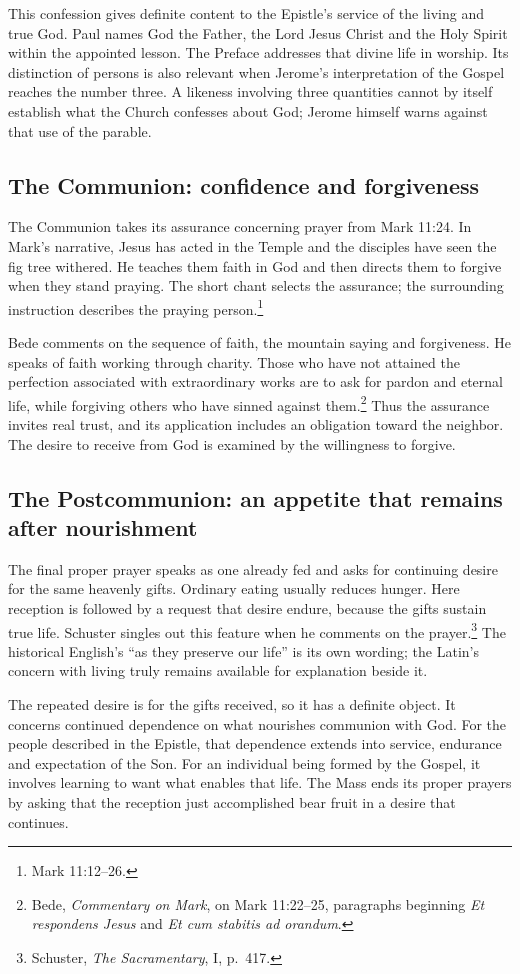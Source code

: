 This confession gives definite content to the Epistle's service of the living and true God. Paul names God the Father, the Lord Jesus Christ and the Holy Spirit within the appointed lesson. The Preface addresses that divine life in worship. Its distinction of persons is also relevant when Jerome's interpretation of the Gospel reaches the number three. A likeness involving three quantities cannot by itself establish what the Church confesses about God; Jerome himself warns against that use of the parable.

\subsection{The Communion: confidence and forgiveness}

The Communion takes its assurance concerning prayer from Mark 11:24. In Mark's narrative, Jesus has acted in the Temple and the disciples have seen the fig tree withered. He teaches them faith in God and then directs them to forgive when they stand praying. The short chant selects the assurance; the surrounding instruction describes the praying person.\footnote{Mark 11:12--26.}

Bede comments on the sequence of faith, the mountain saying and forgiveness. He speaks of faith working through charity. Those who have not attained the perfection associated with extraordinary works are to ask for pardon and eternal life, while forgiving others who have sinned against them.\footnote{Bede, \textit{Commentary on Mark}, on Mark 11:22--25, paragraphs beginning \textit{Et respondens Jesus} and \textit{Et cum stabitis ad orandum}.} Thus the assurance invites real trust, and its application includes an obligation toward the neighbor. The desire to receive from God is examined by the willingness to forgive.

\subsection{The Postcommunion: an appetite that remains after nourishment}

The final proper prayer speaks as one already fed and asks for continuing desire for the same heavenly gifts. Ordinary eating usually reduces hunger. Here reception is followed by a request that desire endure, because the gifts sustain true life. Schuster singles out this feature when he comments on the prayer.\footnote{Schuster, \textit{The Sacramentary}, I, p.~417.} The historical English's ``as they preserve our life'' is its own wording; the Latin's concern with living truly remains available for explanation beside it.

The repeated desire is for the gifts received, so it has a definite object. It concerns continued dependence on what nourishes communion with God. For the people described in the Epistle, that dependence extends into service, endurance and expectation of the Son. For an individual being formed by the Gospel, it involves learning to want what enables that life. The Mass ends its proper prayers by asking that the reception just accomplished bear fruit in a desire that continues.
